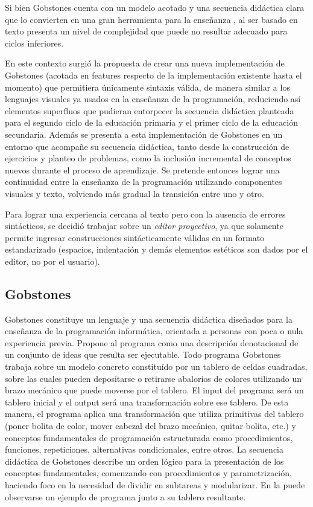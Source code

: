 Si bien Gobstones cuenta con un modelo acotado y una secuencia didáctica clara que lo convierten en una gran herramienta para la enseñanza , al ser basado en texto presenta un nivel de complejidad que puede no resultar adecuado para ciclos inferiores.

En este contexto surgió la propuesta de crear una nueva implementación de Gobstones (acotada en features respecto de la implementación existente hasta el momento) que permitiera únicamente sintaxis válida, de manera similar a los lenguajes visuales ya usados en la enseñanza de la programación, reduciendo así elementos superfluos que pudieran entorpecer la secuencia didáctica planteada para el segundo ciclo de la educación primaria y el primer ciclo de la educación secundaria.
Además se presenta a esta implementación de Gobstones en un entorno que acompañe su secuencia didáctica, tanto desde la construcción de ejercicios y planteo de problemas, como la inclusión incremental de conceptos nuevos durante el proceso de aprendizaje. Se pretende entonces lograr una continuidad entre la enseñanza de la programación utilizando componentes visuales y texto, volviendo más gradual la transición entre uno y otro.

Para lograr una experiencia cercana al texto pero con la ausencia de errores sintácticos, se decidió trabajar sobre un \emph{editor proyectivo}, ya que solamente permite ingresar construcciones sintácticamente válidas en un formato estandarizado (espacios, indentación y demás elementos estéticos son dados por el editor, no por el usuario).

\subsection{Gobstones}

Gobstones constituye un lenguaje y una secuencia didáctica diseñados para la enseñanza de la programación informática, orientada a personas con poca o nula experiencia previa. Propone al programa como una descripción denotacional de un conjunto de ideas que resulta ser ejecutable.
Todo programa Gobstones trabaja sobre un modelo concreto constituído por un tablero de celdas cuadradas, sobre las cuales pueden depositarse o retirarse abalorios de colores utilizando un brazo mecánico que puede moverse por el tablero. El input del programa será un tablero inicial y el output será una transformación sobre ese tablero. De esta manera, el programa aplica una transformación que utiliza primitivas del tablero (poner bolita de color, mover cabezal del brazo mecánico, quitar bolita, etc.) y conceptos fundamentales de programación estructurada como procedimientos, funciones, repeticiones, alternativas condicionales, entre otros.
La secuencia didáctica de Gobstones describe un orden lógico para la presentación de los conceptos fundamentales, comenzando con procedimientos y parametrización, haciendo foco en la necesidad de dividir en subtareas y modularizar. En la  puede observarse un ejemplo de programa junto a su tablero resultante.

